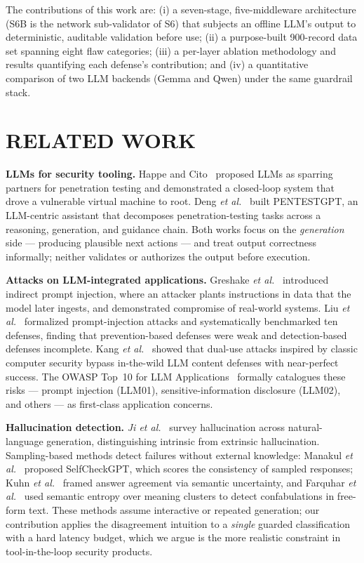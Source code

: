 \documentclass[conference]{IEEEtran}
\begin{document}
The contributions of this work are: (i) a seven-stage, five-middleware architecture (S6B is the network sub-validator of S6) that subjects an offline LLM's output to deterministic, auditable validation before use; (ii) a purpose-built 900-record data set spanning eight flaw categories; (iii) a per-layer ablation methodology and results quantifying each defense's contribution; and (iv) a quantitative comparison of two LLM backends (Gemma and Qwen) under the same guardrail stack.

\section{RELATED WORK}
\textbf{LLMs for security tooling.} Happe and Cito~\cite{happe2023pwned} proposed LLMs as sparring partners for penetration testing and demonstrated a closed-loop system that drove a vulnerable virtual machine to root. Deng \emph{et al.}~\cite{deng2024pentestgpt} built PENTESTGPT, an LLM-centric assistant that decomposes penetration-testing tasks across a reasoning, generation, and guidance chain. Both works focus on the \emph{generation} side --- producing plausible next actions --- and treat output correctness informally; neither validates or authorizes the output before execution.

\textbf{Attacks on LLM-integrated applications.} Greshake \emph{et al.}~\cite{greshake2023indirect} introduced indirect prompt injection, where an attacker plants instructions in data that the model later ingests, and demonstrated compromise of real-world systems. Liu \emph{et al.}~\cite{liu2023promptinjection} formalized prompt-injection attacks and systematically benchmarked ten defenses, finding that prevention-based defenses were weak and detection-based defenses incomplete. Kang \emph{et al.}~\cite{kang2024dualuse} showed that dual-use attacks inspired by classic computer security bypass in-the-wild LLM content defenses with near-perfect success. The OWASP Top~10 for LLM Applications~\cite{owasp2025} formally catalogues these risks --- prompt injection (LLM01), sensitive-information disclosure (LLM02), and others --- as first-class application concerns.

\textbf{Hallucination detection.} \emph{Ji et al.}~\cite{ji2023hallucination} survey hallucination across natural-language generation, distinguishing intrinsic from extrinsic hallucination. Sampling-based methods detect failures without external knowledge: Manakul \emph{et al.}~\cite{manakul2023selfcheckgpt} proposed SelfCheckGPT, which scores the consistency of sampled responses; Kuhn \emph{et al.}~\cite{kuhn2023semantic} framed answer agreement via semantic uncertainty, and Farquhar \emph{et al.}~\cite{farquhar2024semantic} used semantic entropy over meaning clusters to detect confabulations in free-form text. These methods assume interactive or repeated generation; our contribution applies the disagreement intuition to a \emph{single} guarded classification with a hard latency budget, which we argue is the more realistic constraint in tool-in-the-loop security products.
\end{document}
